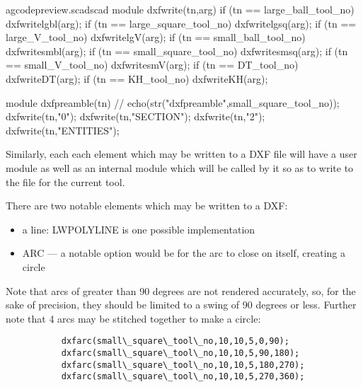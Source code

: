 \documentclass{ltxdoc}
\begin{document}
\lstset{firstnumber=\thegcpscad}
\begin{writecode}{a}{gcodepreview.scad}{scad}
module dxfwrite(tn,arg) {
if (tn == large_ball_tool_no) {
    dxfwritelgbl(arg);}
if (tn == large_square_tool_no) {
    dxfwritelgsq(arg);}
if (tn == large_V_tool_no) {
    dxfwritelgV(arg);}
if (tn == small_ball_tool_no) {
    dxfwritesmbl(arg);}
if (tn == small_square_tool_no) {
    dxfwritesmsq(arg);}
if (tn == small_V_tool_no) {
    dxfwritesmV(arg);}
if (tn == DT_tool_no) {
    dxfwriteDT(arg);}
if (tn == KH_tool_no) {
    dxfwriteKH(arg);}
}

module dxfpreamble(tn) {
//    echo(str("dxfpreamble",small_square_tool_no));
    dxfwrite(tn,"0");
    dxfwrite(tn,"SECTION");
    dxfwrite(tn,"2");
    dxfwrite(tn,"ENTITIES");
}

\end{writecode}
\addtocounter{gcpscad}{27}

 
Similarly, each each element which may be written to a DXF file will have a user module
as well as an internal module which will be called by it so as to write to the file
for the current tool.
 
There are two notable elements which may be written to a DXF:

\begin{itemize}
 \item a line: LWPOLYLINE is one possible implementation
 \item ARC --- a notable option would be for the arc to close on itself, creating a circle
\end{itemize}
 
Note that arcs of greater than 90 degrees are not rendered accurately, so, for the sake of
precision, they should be limited to a swing of 90 degrees or less. Further note that 4 arcs
may be stitched together to make a circle:
 
\begin{verbatim}
           dxfarc(small\_square\_tool\_no,10,10,5,0,90);
           dxfarc(small\_square\_tool\_no,10,10,5,90,180);
           dxfarc(small\_square\_tool\_no,10,10,5,180,270);
           dxfarc(small\_square\_tool\_no,10,10,5,270,360);
\end{verbatim}
 
\end{document}
